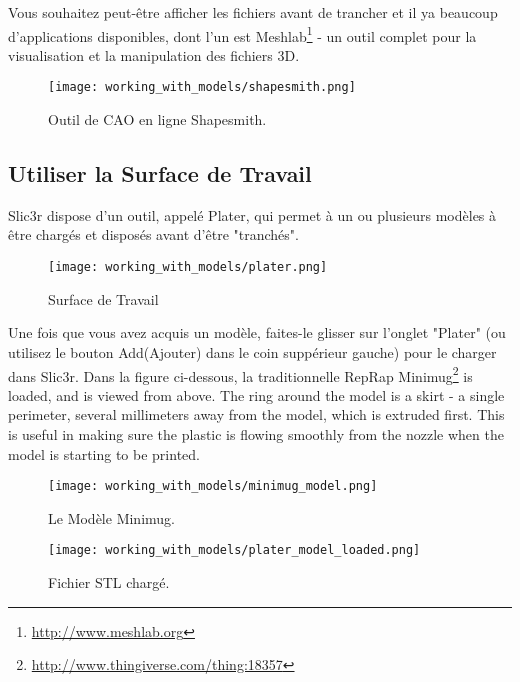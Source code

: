 Vous souhaitez peut-être afficher les fichiers avant de trancher et il ya beaucoup d'applications disponibles, dont l'un est Meshlab\footnote{\url{http://www.meshlab.org}} - un outil complet pour la visualisation et la manipulation des fichiers 3D.

\begin{figure}[H]
\centering
\texttt{[image: working\_with\_models/shapesmith.png]}
\caption{Outil de CAO en ligne Shapesmith.}
\label{fig:shapesmith}
\end{figure}



\subsection{Utiliser la Surface de Travail} %
\label{sub:working_with_plater}
Slic3r dispose d'un outil, appelé Plater, qui permet à un ou plusieurs modèles à être chargés et disposés avant d'être "tranchés".

\begin{figure}[H]
\centering
\texttt{[image: working\_with\_models/plater.png]}
\caption{Surface de Travail}
\label{fig:plater}
\end{figure}


Une fois que vous avez acquis un modèle, faites-le glisser sur l'onglet "Plater" (ou utilisez le bouton Add(Ajouter) dans le coin suppérieur gauche) pour le charger dans Slic3r. Dans la figure ci-dessous, la traditionnelle RepRap Minimug\footnote{\url{http://www.thingiverse.com/thing:18357}} is loaded, and is viewed from above. The ring around the model is a skirt - a single perimeter, several millimeters away from the model, which is extruded first.  This is useful in making sure the plastic is flowing smoothly from the nozzle when the model is starting to be printed.

\begin{figure}[H]
\centering
\texttt{[image: working\_with\_models/minimug\_model.png]}
\caption{Le Modèle Minimug.}
\label{fig:minimug_model}
\end{figure}

\begin{figure}[H]
\centering
\texttt{[image: working\_with\_models/plater\_model\_loaded.png]}
\caption{Fichier STL chargé.}
\label{fig:plater_model_loaded}
\end{figure}

